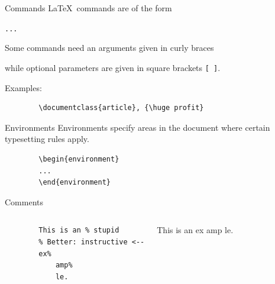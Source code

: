 \documentclass[table]{beamer}
\newcommand{\latex}{\LaTeX\ }
\begin{document}
\begin{frame}[fragile]{Commands}
    \latex commands are of the form

    \begin{center}
        \texttt{...}
    \end{center}
    Some commands need an arguments given in curly braces \texttt{{ }}

    \vspace{.5em}
    while optional parameters are given in square brackets \texttt{[ ]}.

    \vspace{.5em}
    Examples:

    \vspace{.5em}
    \begin{verbatim}
        \documentclass{article}, {\huge profit}
    \end{verbatim}
\end{frame}

\begin{frame}[fragile]{Environments}
    Environments specify areas in the document where certain typesetting rules
    apply.

    \begin{center}
        \begin{verbatim}
        \begin{environment}
        ...
        \end{environment}
        \end{verbatim}
    \end{center}
\end{frame}

\begin{frame}[fragile]{Comments}
    \begin{columns}
        \begin{verbatim}
        This is an % stupid
        % Better: instructive <--
        ex%
            amp%
            le.
        \end{verbatim}
        This is an %
        ex%
        amp%
        le.
    \end{columns}
\end{frame}
\end{document}
